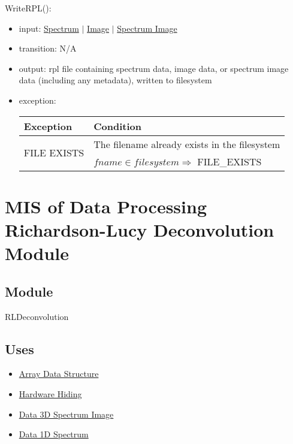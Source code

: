 \documentclass[12pt, titlepage]{article}
\begin{document}
\noindent WriteRPL():
\begin{itemize}
    \item input: \hyperref[Mod:Spectrum]{Spectrum} $|$
    \hyperref[Mod:Image]{Image} $|$ \hyperref[Mod:SI]{Spectrum Image}
    \item transition: N/A
    \item output: rpl file containing spectrum data, image data, or spectrum
    image data (including any metadata), written to filesystem
    \item exception:
    \begin{center}
        \begin{tabular}{p{3cm} p{12cm}}
            \toprule[0.15em]
            \textbf{Exception} & \textbf{Condition}\\
            \midrule[0.1em]
            \multirow{2}{0.25\textwidth}{FILE EXISTS} & The filename already
            exists in the filesystem\\ 
            & $fname \in filesystem \Rightarrow$ FILE\_EXISTS\\ 
            \bottomrule[0.15em]
        \end{tabular}
    \end{center}
\end{itemize}

\section{MIS of Data Processing Richardson-Lucy Deconvolution Module}
\label{Mod: RLDeconvolution}

\subsection{Module}

RLDeconvolution

\subsection{Uses}
\begin{itemize}
    \item \hyperref[Mod:Array]{Array Data Structure}
    \item \hyperref[Mod:HH]{Hardware Hiding}
    \item \hyperref[Mod:SI]{Data 3D Spectrum Image}
    \item \hyperref[Mod:Spectrum]{Data 1D Spectrum}
\end{itemize}
\end{document}
